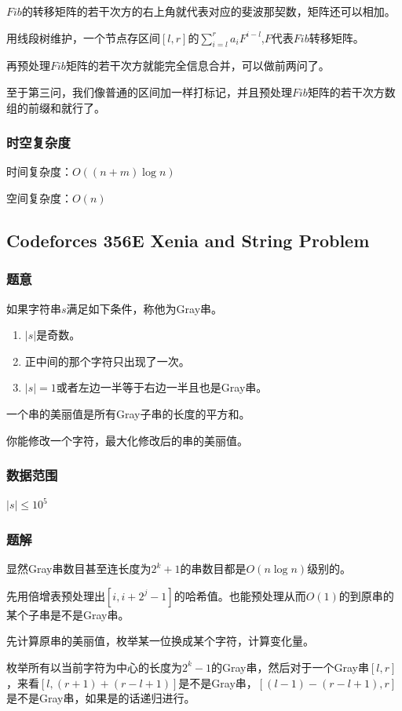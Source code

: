 \documentclass{ctexart}
\begin{document}
$Fib$的转移矩阵的若干次方的右上角就代表对应的斐波那契数，矩阵还可以相加。

用线段树维护，一个节点存区间$[l,r]$的$\sum\limits_{i=l}^r a_i F^{i-l}$,$F$代表$Fib$转移矩阵。

再预处理$Fib$矩阵的若干次方就能完全信息合并，可以做前两问了。

至于第三问，我们像普通的区间加一样打标记，并且预处理$Fib$矩阵的若干次方数组的前缀和就行了。
\subsubsection{时空复杂度}
时间复杂度：$O((n+m) \log n)$

空间复杂度：$O(n)$
\subsection{Codeforces 356E Xenia and String Problem}
\subsubsection{题意}
如果字符串$s$满足如下条件，称他为Gray串。

\begin{enumerate}
\item $|s|$是奇数。
\item 正中间的那个字符只出现了一次。
\item $|s|=1$或者左边一半等于右边一半且也是Gray串。
\end{enumerate}

一个串的美丽值是所有Gray子串的长度的平方和。

你能修改一个字符，最大化修改后的串的美丽值。
\subsubsection{数据范围}
$|s| \le 10^5$
\subsubsection{题解}
显然Gray串数目甚至连长度为$2^k+1$的串数目都是$O(n \log n)$级别的。

先用倍增表预处理出$[i,i+2^j-1]$的哈希值。也能预处理从而$O(1)$的到原串的某个子串是不是Gray串。

先计算原串的美丽值，枚举某一位换成某个字符，计算变化量。

枚举所有以当前字符为中心的长度为$2^k-1$的Gray串，然后对于一个Gray串$[l,r]$，来看$[l,(r+1)+(r-l+1)]$是不是Gray串，$[(l-1)-(r-l+1),r]$是不是Gray串，如果是的话递归进行。
\end{document}
